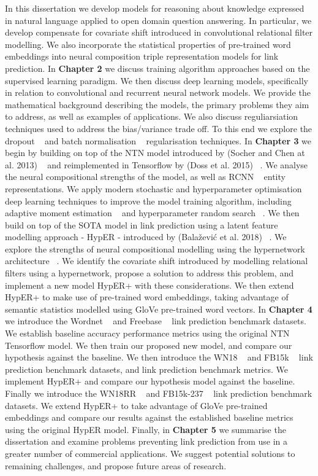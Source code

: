 In this dissertation we develop models for reasoning about knowledge expressed in natural language applied to open domain question answering. In particular, we develop compensate for covariate shift introduced in convolutional relational filter modelling. We also incorporate the statistical properties of pre-trained word embeddings into neural composition triple representation models for link prediction. \newline
In \textbf{Chapter 2} we discuss training algorithm approaches based on the supervised learning paradigm. We then discuss deep learning models, specifically in relation to convolutional and recurrent neural network models. We provide the mathematical background describing the models, the primary problems they aim to address, as well as examples of applications. We also discuss reguliarsiation techniques used to address the bias/variance trade off. To this end we explore the dropout ~\citep{srivastava2014dropout} and batch normalisation ~\citep{ioffe2015batch} regularisation techniques.   \newline
In \textbf{Chapter 3} we begin by building on top of the NTN model introduced by (Socher and Chen at al. 2013) ~\citep{socher2013reasoning} and reimplemented in Tensorflow by (Doss et al. 2015) ~\citep{Doss2015}. We analyse the neural compositional strengths of the model, as well as RCNN ~\citep{socher2012semantic} entity representations.  We apply modern stochastic and hyperparameter optimisation deep learning techniques to improve the model training algorithm, including adaptive moment estimation ~\citep{kingma2014adam} and hyperparameter random search ~\citep{bergstra2012random}. We then build on top of the SOTA model in link prediction using a latent feature modelling approach - HypER - introduced by (Bala\v{z}evi\'c et al. 2018) ~\citep{balazevic2019hypernetwork}. We explore the strengths of neural compositional modelling using the hypernetwork architecture ~\citep{ha2016hypernetworks}. We identify the covariate shift introduced by modelling relational filters using a hypernetwork, propose a solution to address this problem, and implement a new model HypER+ with these considerations. We then extend HypER+ to make use of pre-trained word embeddings, taking advantage of semantic statistics modelled using GloVe pre-trained word vectors. \newline
In \textbf{Chapter 4} we introduce the Wordnet ~\citep{miller1995wordnet} and Freebase ~\citep{bollacker2008freebase} link prediction benchmark datasets. We establish baseline accuracy performance metrics using the original NTN Tensorflow model. We then train our proposed new model, and compare our hypothesis against the baseline. We then introduce the WN18 ~\citep{bordes2014semantic} and FB15k ~\citep{bordes2013translating} link prediction benchmark datasets, and link prediction benchmark metrics. We implement HypER+ and compare our hypothesis model against the baseline. Finally we introduce the WN18RR ~\citep{dettmers2018convolutional} and FB15k-237 ~\citep{toutanova2015observed} link prediction benchmark datasets. We extend HypER+ to take advantage of GloVe pre-trained embeddings and compare our results against the established baseline metrics using the original HypER model. \newline
Finally, in \textbf{Chapter 5} we summarise the dissertation and examine problems preventing link prediction from use in a greater number of commercial applications. We suggest potential solutions to remaining challenges, and propose future areas of research.


